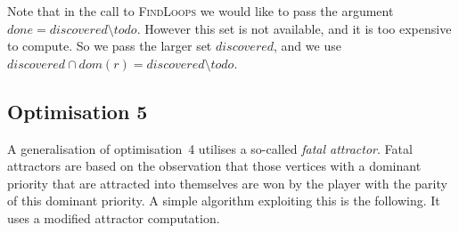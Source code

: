 \documentclass{article}
\begin{document}
Note that in the call to \textsc{FindLoops} we would like to pass the argument $done = discovered \setminus todo$.
However this set is not available, and it is too expensive to compute. So we pass the larger set $discovered$, and we use $discovered \cap dom(r) = discovered \setminus todo$.

\subsection{Optimisation 5} 

A generalisation of optimisation~4 utilises a so-called \emph{fatal attractor}. Fatal attractors are based on the
observation that those vertices with a dominant priority that are attracted into themselves are won by the player
with the parity of this dominant priority. A simple algorithm exploiting this is the following. It uses a modified
attractor computation.
\end{document}
